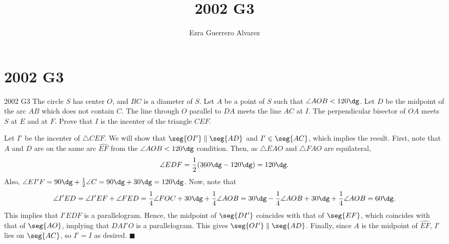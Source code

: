 \documentclass[14pt]{article}
\title{2002 G3}
\author{Ezra Guerrero Alvarez}
\begin{document}
\maketitle
	
\section*{2002 G3}

\begin{statement}{2002 G3}
	The circle $S$ has center $O$, and $BC$ is a diameter of $S$. Let $A$ be a point of $S$ such that $\angle AOB<120\dg$.  Let $D$ be the midpoint of the arc $AB$ which does not contain $C$. The line through $O$ parallel to $DA$ meets the line $AC$ at $I$. The perpendicular bisector of $OA$ meets $S$ at $E$ and at $F$. Prove that $I$ is the incenter of the triangle $CEF$.
\end{statement}
Let $I'$ be the incenter of $\triangle CEF$. We will show that $\seg{OI'}\parallel\seg{AD}$ and $I'\in\seg{AC}$, which implies the result. First, note that $A$ and $D$ are on the same arc $\widehat{EF}$ from the $\angle AOB < 120\dg$ condition. Then, as $\triangle EAO$ and $\triangle FAO$ are equilateral, 
\[\angle EDF = \frac12(360\dg-120\dg)=120\dg. \]
Also, $\angle EI'F=90\dg+\frac12\angle C=90\dg+30\dg=120\dg$. Now, note that
\[\angle I'ED = \angle I'EF + \angle FED = \frac14\angle FOC + 30\dg + \frac14\angle AOB = 30\dg-\frac14\angle AOB + 30\dg + \frac14\angle AOB=60\dg. \]
This implies that $I'EDF$ is a parallelogram. Hence, the midpoint of $\seg{DI'}$ coincides with that of $\seg{EF}$, which coincides with that of $\seg{AO}$, implying that $DAI'O$ is a parallelogram. This gives $\seg{OI'}\parallel\seg{AD}$. Finally, since $A$ is the midpoint of $\widehat{EF}$, $I'$ lies on $\seg{AC}$, so $I'=I$ as desired. $\blacksquare$
	
\end{document}
